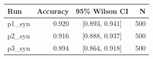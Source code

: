 \begin{tabular}{lrcr}
\toprule
Run & Accuracy & 95\% Wilson CI & N \\
\midrule
p1_syn & 0.920 & [0.893, 0.941] & 500 \\
p2_syn & 0.916 & [0.888, 0.937] & 500 \\
p3_syn & 0.894 & [0.864, 0.918] & 500 \\
\bottomrule
\end{tabular}
